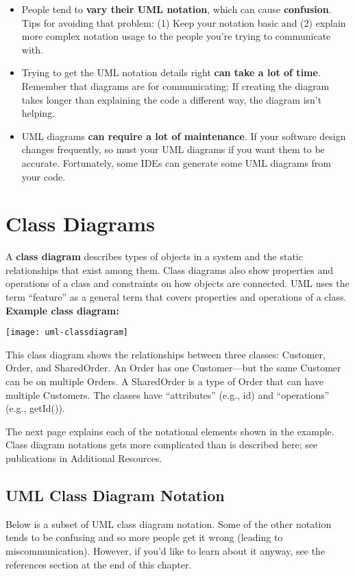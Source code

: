 \begin{itemize}
\item People tend to \textbf{vary their UML notation}, which can cause \textbf{confusion}. Tips for avoiding that problem: (1) Keep your notation basic and (2) explain more complex notation usage to the people you're trying to communicate with.\\
\item Trying to get the UML notation details right \textbf{can take a lot of time}. Remember that diagrams are for communicating; If creating the diagram takes longer than explaining the code a different way, the diagram isn't helping.\\
\item UML diagrams \textbf{can require a lot of maintenance}. If your software design changes frequently, so must your UML diagrams if you want them to be accurate. Fortunately, some IDEs can generate some UML diagrams from your code.
\end{itemize}

\section{Class Diagrams}

A \textbf{class diagram} describes types of objects in a system and the static relationships that exist among them. Class diagrams also show properties and operations of a class and constraints on how objects are connected. UML uses the term ``feature'' as a general term that covers properties and operations of a class.\\

\noindent\textbf{Example class diagram:}
\begin{center}
\texttt{[image: uml-classdiagram]}
\end{center}

This class diagram shows the relationships between three classes: Customer, Order, and SharedOrder. An Order has one Customer---but the same Customer can be on multiple Orders. A SharedOrder is a type of Order that can have multiple Customers. The classes have ``attributes'' (e.g., id) and ``operations'' (e.g., getId()).

The next page explains each of the notational elements shown in the example. Class diagram notations gets more complicated than is described here; see publications in Additional Resources.

\subsection{UML Class Diagram Notation}
Below is a subset of UML class diagram notation. Some of the other notation tends to be confusing and so more people get it wrong (leading to miscommunication). However, if you'd like to learn about it anyway, see the references section at the end of this chapter.

